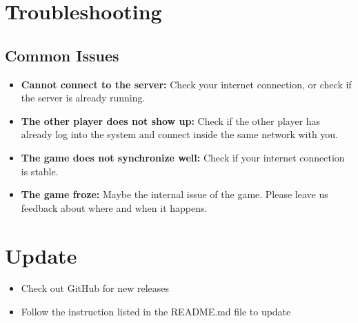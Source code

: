 \documentclass[12pt, titlepage]{article}
\begin{document}
\section{Troubleshooting}

\subsection{Common Issues}
\begin{itemize}
    \item \textbf{Cannot connect to the server:} Check your internet connection, or check if the server is already running.
    \item \textbf{The other player does not show up:} Check if the other player has already log into the system and connect inside the same network with you.
    \item \textbf{The game does not synchronize well:} Check if your internet connection is stable.
    \item \textbf{The game froze:} Maybe the internal issue of the game. Please leave us feedback about where and when it happens.
\end{itemize}

\section{Update}
\begin{itemize}
    \item Check out GitHub for new releases
    \item Follow the instruction listed in the README.md file to update
\end{itemize}
\end{document}
